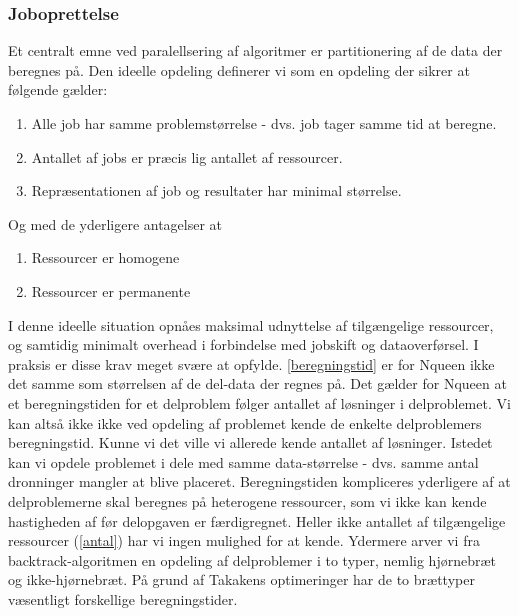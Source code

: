 \documentclass[draft,a4paper,10pt]{article}
\begin{document}
\subsubsection{Joboprettelse}
Et centralt emne ved paralellsering af algoritmer er partitionering af de data der beregnes på. Den ideelle opdeling definerer vi som en opdeling der sikrer at følgende gælder:
\begin{enumerate}
	\item Alle job har samme problemstørrelse - dvs. job tager samme tid at beregne.\label{beregningstid}
	\item Antallet af jobs er præcis lig antallet af ressourcer.\label{antal}
	\item Repræsentationen af job og resultater har minimal størrelse.\label{jobbeskrivelse}
\end{enumerate} 
Og med de yderligere antagelser at
\begin{enumerate}
	\item Ressourcer er homogene
	\item Ressourcer er permanente
\end{enumerate}
I denne ideelle situation opnåes maksimal udnyttelse af tilgængelige ressourcer, og samtidig minimalt overhead i forbindelse med jobskift og dataoverførsel.
I praksis er disse krav meget svære at opfylde. \ref{beregningstid} er for Nqueen ikke det samme som størrelsen af de del-data der regnes på. Det gælder for Nqueen at et beregningstiden for et delproblem følger antallet af løsninger i delproblemet. Vi kan altså ikke ikke ved opdeling af problemet kende de enkelte delproblemers beregningstid. Kunne vi det ville vi allerede kende antallet af løsninger. Istedet kan vi opdele problemet i dele med samme data-størrelse - dvs. samme antal dronninger mangler at blive placeret.   Beregningstiden kompliceres yderligere af at delproblemerne skal beregnes på heterogene ressourcer, som vi ikke kan kende hastigheden af før delopgaven er færdigregnet. Heller ikke antallet af tilgængelige ressourcer (\ref{antal}) har vi ingen mulighed for at kende. Ydermere arver vi fra backtrack-algoritmen en opdeling af delproblemer i to typer, nemlig hjørnebræt og ikke-hjørnebræt. På grund af Takakens optimeringer  har de to brættyper væsentligt forskellige beregningstider. 
\end{document}
